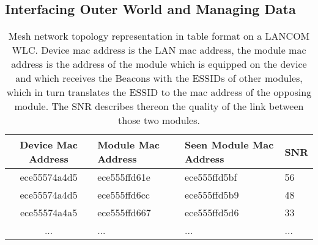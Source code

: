     \subsection{Interfacing Outer World and Managing Data}      
     \begin{table}[h!]
	\begin{tabular}{clll}
	  Device Mac Address & Module Mac Address & Seen Module Mac Address & \ac{SNR}\\ \hline
	  ece55574a4d5 & ece555ffd61e & ece555ffd5bf & 56 \\
	  ece55574a4d5 & ece555ffd6cc & ece555ffd5b9 & 48 \\
	  ece55574a4a5 & ece555ffd667 & ece555ffd5d6 & 33 \\
	  ... & ... & ... & ...
	\end{tabular}
	\caption{Mesh network topology representation in table format on a LANCOM WLC. Device mac address is the LAN mac address, the module mac address is
	  the address of the module which is equipped on the device and which receives the Beacons with the ESSIDs of other modules, which in turn translates
	  the ESSID to the mac address of the opposing module. The \ac{SNR} describes thereon the quality of the link between those two modules.}
	\label{tab:wlc}
      \end{table}
      
\newpage
      
